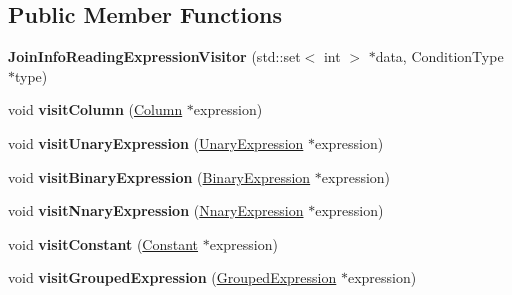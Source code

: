 \subsection*{Public Member Functions}
\begin{DoxyCompactItemize}
\item 
\hypertarget{class_join_info_reading_expression_visitor_ab9cdf35ad447efd3cfba98440d3e135a}{{\bfseries Join\+Info\+Reading\+Expression\+Visitor} (std\+::set$<$ int $>$ $\ast$data, Condition\+Type $\ast$type)}\label{class_join_info_reading_expression_visitor_ab9cdf35ad447efd3cfba98440d3e135a}

\item 
\hypertarget{class_join_info_reading_expression_visitor_a03c3ec1bc690b6d9dc66a97efa75f2be}{void {\bfseries visit\+Column} (\hyperlink{class_column}{Column} $\ast$expression)}\label{class_join_info_reading_expression_visitor_a03c3ec1bc690b6d9dc66a97efa75f2be}

\item 
\hypertarget{class_join_info_reading_expression_visitor_a2254ead29d9226c771b530f43b677bd0}{void {\bfseries visit\+Unary\+Expression} (\hyperlink{class_unary_expression}{Unary\+Expression} $\ast$expression)}\label{class_join_info_reading_expression_visitor_a2254ead29d9226c771b530f43b677bd0}

\item 
\hypertarget{class_join_info_reading_expression_visitor_a6c6326b1ca8218ed35ac86ab7d487a0e}{void {\bfseries visit\+Binary\+Expression} (\hyperlink{class_binary_expression}{Binary\+Expression} $\ast$expression)}\label{class_join_info_reading_expression_visitor_a6c6326b1ca8218ed35ac86ab7d487a0e}

\item 
\hypertarget{class_join_info_reading_expression_visitor_a81cdbded017bc5e294b014122b94391c}{void {\bfseries visit\+Nnary\+Expression} (\hyperlink{class_nnary_expression}{Nnary\+Expression} $\ast$expression)}\label{class_join_info_reading_expression_visitor_a81cdbded017bc5e294b014122b94391c}

\item 
\hypertarget{class_join_info_reading_expression_visitor_a5d94ca3c0172aeaf3436fd15f3d9ba35}{void {\bfseries visit\+Constant} (\hyperlink{class_constant}{Constant} $\ast$expression)}\label{class_join_info_reading_expression_visitor_a5d94ca3c0172aeaf3436fd15f3d9ba35}

\item 
\hypertarget{class_join_info_reading_expression_visitor_af727a4e4a952f05080c8659ce0cff208}{void {\bfseries visit\+Grouped\+Expression} (\hyperlink{class_grouped_expression}{Grouped\+Expression} $\ast$expression)}\label{class_join_info_reading_expression_visitor_af727a4e4a952f05080c8659ce0cff208}

\end{DoxyCompactItemize}

